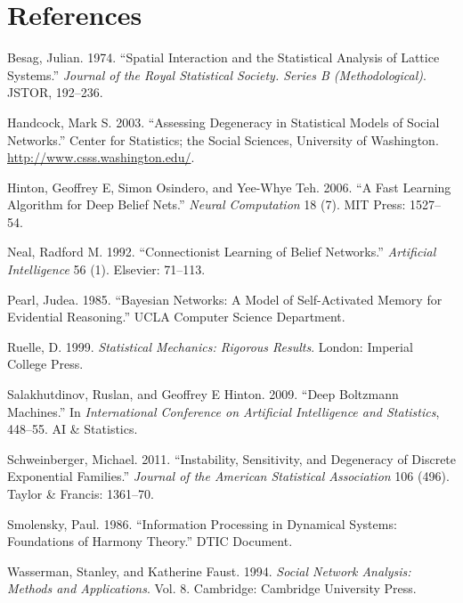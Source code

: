 \documentclass[]{article}
\theoremstyle{definition}
\begin{document}
\clearpage

\section*{References}\label{references}

\hypertarget{refs}{}
\hypertarget{ref-besag1974spatial}{}
Besag, Julian. 1974. ``Spatial Interaction and the Statistical Analysis
of Lattice Systems.'' \emph{Journal of the Royal Statistical Society.
Series B (Methodological)}. JSTOR, 192--236.

\hypertarget{ref-handcock2003assessing}{}
Handcock, Mark S. 2003. ``Assessing Degeneracy in Statistical Models of
Social Networks.'' Center for Statistics; the Social Sciences,
University of Washington. \url{http://www.csss.washington.edu/}.

\hypertarget{ref-hinton2006fast}{}
Hinton, Geoffrey E, Simon Osindero, and Yee-Whye Teh. 2006. ``A Fast
Learning Algorithm for Deep Belief Nets.'' \emph{Neural Computation} 18
(7). MIT Press: 1527--54.

\hypertarget{ref-neal1992connectionist}{}
Neal, Radford M. 1992. ``Connectionist Learning of Belief Networks.''
\emph{Artificial Intelligence} 56 (1). Elsevier: 71--113.

\hypertarget{ref-pearl985bayesian}{}
Pearl, Judea. 1985. ``Bayesian Networks: A Model of Self-Activated
Memory for Evidential Reasoning.'' UCLA Computer Science Department.

\hypertarget{ref-ruelle1999statistical}{}
Ruelle, D. 1999. \emph{Statistical Mechanics: Rigorous Results}. London:
Imperial College Press.

\hypertarget{ref-salakhutdinov2009deep}{}
Salakhutdinov, Ruslan, and Geoffrey E Hinton. 2009. ``Deep Boltzmann
Machines.'' In \emph{International Conference on Artificial Intelligence
and Statistics}, 448--55. AI \& Statistics.

\hypertarget{ref-schweinberger2011instability}{}
Schweinberger, Michael. 2011. ``Instability, Sensitivity, and Degeneracy
of Discrete Exponential Families.'' \emph{Journal of the American
Statistical Association} 106 (496). Taylor \& Francis: 1361--70.

\hypertarget{ref-smolensky1986information}{}
Smolensky, Paul. 1986. ``Information Processing in Dynamical Systems:
Foundations of Harmony Theory.'' DTIC Document.

\hypertarget{ref-wasserman1994social}{}
Wasserman, Stanley, and Katherine Faust. 1994. \emph{Social Network
Analysis: Methods and Applications}. Vol. 8. Cambridge: Cambridge
University Press.
\end{document}
